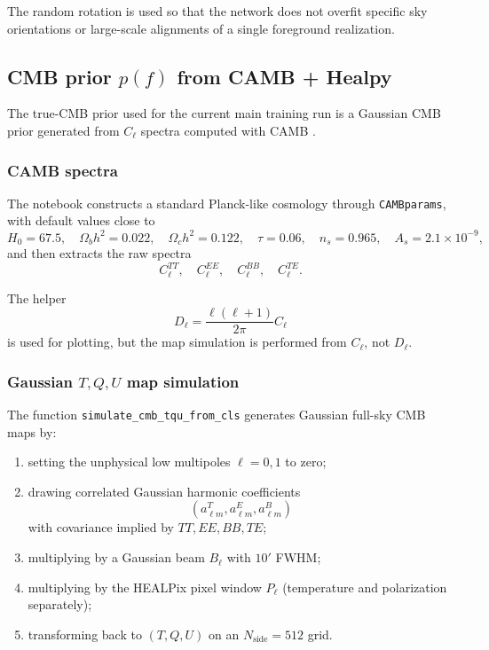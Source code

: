 \documentclass[11pt]{article}
\begin{document}
The random rotation is used so that the network does not overfit specific sky orientations or large-scale alignments of a single foreground realization.

\subsection{CMB prior \(p(f)\) from CAMB + Healpy}

The true-CMB prior used for the current main training run is a Gaussian CMB prior generated from \(C_\ell\) spectra computed with CAMB \cite{lewis2000camb}.

\subsubsection{CAMB spectra}

The notebook constructs a standard Planck-like cosmology through \texttt{CAMBparams}, with default values close to
\begin{equation}
  H_0=67.5,\quad
  \Omega_b h^2 = 0.022,\quad
  \Omega_c h^2 = 0.122,\quad
  \tau = 0.06,\quad
  n_s=0.965,\quad
  A_s = 2.1 \times 10^{-9},
\end{equation}
and then extracts the raw spectra
\begin{equation}
  C_\ell^{TT},\quad C_\ell^{EE},\quad C_\ell^{BB},\quad C_\ell^{TE}.
\end{equation}

The helper
\begin{equation}
  D_\ell = \frac{\ell(\ell+1)}{2\pi} C_\ell
\end{equation}
is used for plotting, but the map simulation is performed from \(C_\ell\), not \(D_\ell\).

\subsubsection{Gaussian \(T,Q,U\) map simulation}

The function \texttt{simulate\_cmb\_tqu\_from\_cls} generates Gaussian full-sky CMB maps by:
\begin{enumerate}[leftmargin=1.5em]
  \item setting the unphysical low multipoles \(\ell=0,1\) to zero;
  \item drawing correlated Gaussian harmonic coefficients
  \begin{equation}
    (a_{\ell m}^T, a_{\ell m}^E, a_{\ell m}^B)
  \end{equation}
  with covariance implied by \(TT,EE,BB,TE\);
  \item multiplying by a Gaussian beam \(B_\ell\) with \(10'\) FWHM;
  \item multiplying by the HEALPix pixel window \(P_\ell\) (temperature and polarization separately);
  \item transforming back to \((T,Q,U)\) on an \(N_{\mathrm{side}}=512\) grid.
\end{enumerate}
\end{document}
